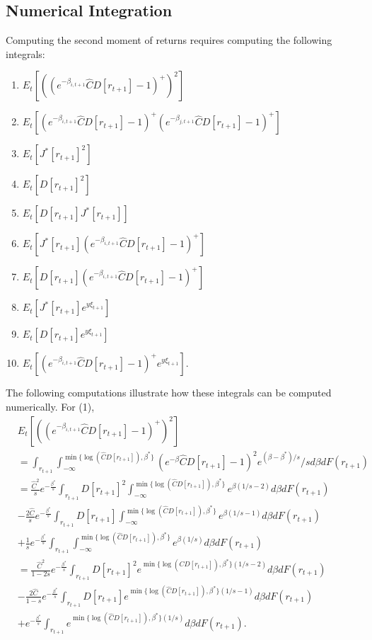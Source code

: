 \subsection{Numerical Integration}
Computing the second moment of returns requires computing the following integrals:
\begin{enumerate}
\item $E_t[((e^{-\beta_{i, t+1}} \hat C D[r_{t+1}] - 1)^+)^2]$
\item $ E_t[(e^{-\beta_{i, t+1}} \hat C D[r_{t+1}] - 1)^+ (e^{-\beta_{j, t+1}} \hat C D[r_{t+1}] - 1)^+] $
\item $ E_t[J^*[r_{t+1}]^2] $
\item $ E_t[D[r_{t+1}]^2] $
\item $ E_t[D[r_{t+1}] J^*[r_{t+1}]]$
\item $ E_t[J^*[r_{t+1}] (e^{-\beta_{i, t+1}} \hat C D[r_{t+1}] - 1)^+]$
\item $ E_t[D[r_{t+1}] (e^{-\beta_{i, t+1}} \hat C D[r_{t+1}] - 1)^+]$
\item $ E_t[J^*[r_{t+1}] e^{y \xi_{t+1}}]$
\item $ E_t[D[r_{t+1}] e^{y \xi_{t+1}}]$
\item $ E_t[(e^{-\beta_{i, t+1}} \hat C D[r_{t+1}] - 1)^+ e^{y \xi_{t+1}}].$
\end{enumerate}

The following computations illustrate how these integrals can be computed numerically. For (1), 
\begin{align*}
&E_t[((e^{-\beta_{i, t+1}} \hat C D[r_{t+1}] - 1)^+)^2] \\
&= \int_{r_{t+1}} \int_{-\infty}^{\min\{\log (\hat C D[r_{t+1}]), \beta^* \}}(e^{-\beta} \hat C D[r_{t+1}] - 1)^2 e^{(\beta - \beta^*) / s} / s d \beta d F (r_{t+1}) \\
&= \frac{\hat C^2}{s} e^{-\frac{\beta^*}{s}}\int_{r_{t+1}}D[r_{t+1}]^2 \int_{-\infty}^{\min\{\log (\hat C D[r_{t+1}]), \beta^* \}} e^{\beta  (1/ s - 2)}  d \beta d F (r_{t+1})\\
 &- \frac{2\hat C}{s} e^{-\frac{\beta^*}{s}}\int_{r_{t+1}}D[r_{t+1}] \int_{-\infty}^{\min\{\log (\hat C D[r_{t+1}]), \beta^* \}} e^{\beta  (1/ s - 1)}  d \beta d  F (r_{t+1}) \\
 &+\frac{1}{s} e^{-\frac{\beta^*}{s}}\int_{r_{t+1}}\int_{-\infty}^{\min\{\log (\hat C D[r_{t+1}]), \beta^* \}} e^{\beta  (1/ s )}  d \beta d F (r_{t+1}) \\
&= \frac{\hat C^2}{1-2s} e^{-\frac{\beta^*}{s}}\int_{r_{t+1}}D[r_{t+1}]^2  e^{\min\{\log (\hat C D[r_{t+1}]), \beta^* \}  (1/ s - 2)}  d \beta d F (r_{t+1})\\ 
&- \frac{2\hat C}{1-s} e^{-\frac{\beta^*}{s}}\int_{r_{t+1}}D[r_{t+1}] e^{\min\{\log (\hat C D[r_{t+1}]), \beta^* \}  (1/ s - 1)}  d \beta d F (r_{t+1}) \\
 &+ e^{-\frac{\beta^*}{s}}\int_{r_{t+1}} e^{\min\{\log (\hat C D[r_{t+1}]), \beta^* \}  (1/ s )}  d \beta d F (r_{t+1}).
 \end{align*}

